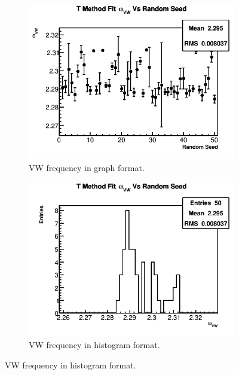 \begin{figure}[]
	   	\vspace{4mm}
	    \begin{subfigure}[t]{0.45\textwidth}
		    \centering
			\includegraphics[width=\textwidth]{TMethod_omega_VW_Vs_Iter_Canv}
		    \caption{VW frequency in graph format.}
	    \end{subfigure}
	    \hspace{4mm}
	    \begin{subfigure}[t]{0.45\textwidth}
		    \centering
			\includegraphics[width=\textwidth]{TMethod_omega_VW_Vs_Iter_Canv_hist}
		    \caption{VW frequency in histogram format.}
	    \end{subfigure}%
	   	\vspace{4mm}

\end{figure}
